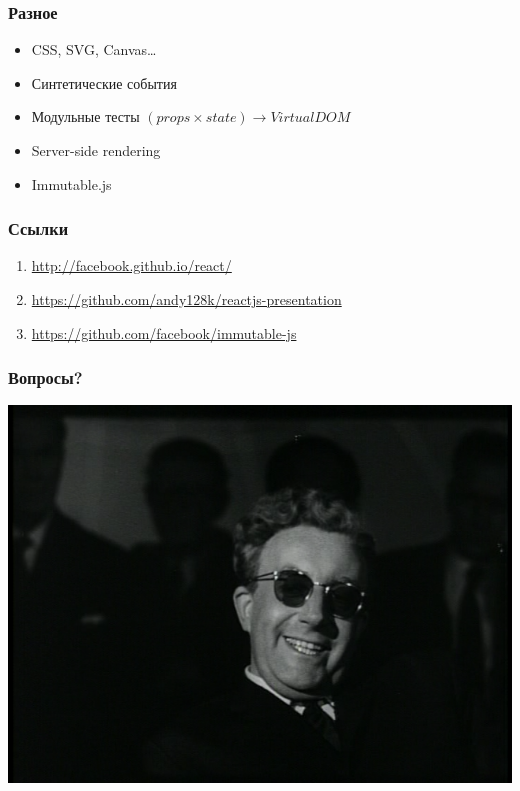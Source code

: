 \documentclass[10pt,utf8]{beamer}
\begin{document}
\begin{frame}[fragile]
  \frametitle{Разное}

  \begin{itemize}
  \item CSS, SVG, Canvas\dots
    \pause
  \item Синтетические события
    \pause
  \item Модульные тесты $(props \times state) \rightarrow Virtual DOM$
    \pause
  \item Server-side rendering
    \pause
  \item Immutable.js
  \end{itemize}
\end{frame}

\begin{frame}[fragile]
  \frametitle{Ссылки}

  \begin{enumerate}
  \item \href{http://facebook.github.io/react/}{http://facebook.github.io/react/}
  \item \href{https://github.com/andy128k/reactjs-presentation}{https://github.com/andy128k/reactjs-presentation}
  \item \href{https://github.com/facebook/immutable-js}{https://github.com/facebook/immutable-js}
  \end{enumerate}
\end{frame}

\begin{frame}[fragile]
  \frametitle{Вопросы?}

  \begin{center}
    \includegraphics[scale=0.25]{strangelove.png}
  \end{center}
\end{frame}
\end{document}
